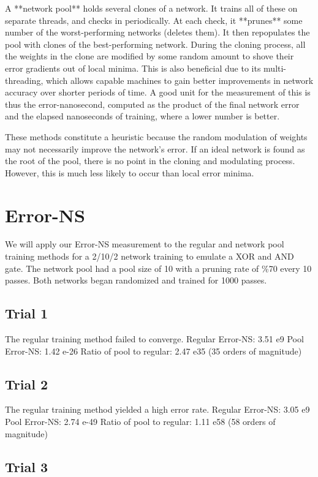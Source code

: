 \documentclass[8pt]{amsart}
\begin{document}
A **network pool** holds several clones of a network. It trains all of these on
separate threads, and checks in periodically. At each check, it **prunes** some
number of the worst-performing networks (deletes them). It then repopulates the
pool with clones of the best-performing network. During the cloning process, all
the weights in the clone are modified by some random amount to shove their
error gradients out of local minima. This is also beneficial due to its multi-
threading, which allows capable machines to gain better improvements in network
accuracy over shorter periods of time. A good unit for the measurement of this
is thus the error-nanosecond, computed as the product of the final network error
and the elapsed nanoseconds of training, where a lower number is better.

These methods constitute a heuristic because the random modulation of weights
may not necessarily improve the network's error. If an ideal network is found
as the root of the pool, there is no point in the cloning and modulating process.
However, this is much less likely to occur than local error minima.

\section{Error-NS}

We will apply our Error-NS measurement to the regular and network pool training
methods for a 2/10/2 network training to emulate a XOR and AND gate. The network
pool had a pool size of 10 with a pruning rate of \%70 every 10 passes. Both
networks began randomized and trained for 1000 passes.

\subsection{Trial 1}

The regular training method failed to converge.
Regular Error-NS: 3.51 e9
Pool Error-NS: 1.42 e-26
Ratio of pool to regular: 2.47 e35 (35 orders of magnitude)

\subsection{Trial 2}

The regular training method yielded a high error rate.
Regular Error-NS: 3.05 e9
Pool Error-NS: 2.74 e-49
Ratio of pool to regular: 1.11 e58 (58 orders of magnitude)

\subsection{Trial 3}
\end{document}
